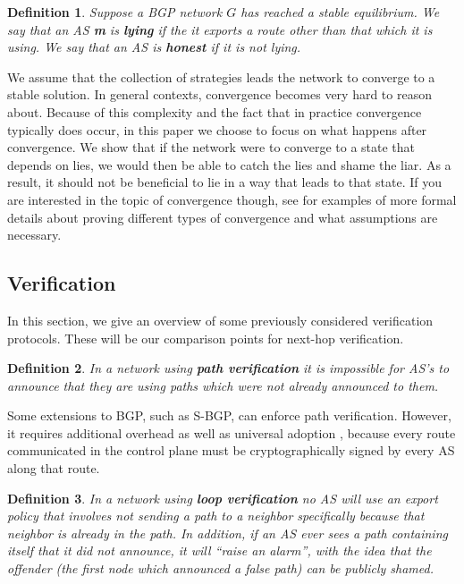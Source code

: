 \documentclass[10pt]{article}
\newtheorem{definition}{Definition}
\begin{document}
    \begin{definition}
      Suppose a BGP network $G$ has reached a stable equilibrium.
      We say that an AS \textbf{m} is \textbf{lying} if the
      it exports a route other than that which it is using.
      We say that an AS is \textbf{honest} if it is not lying.
    \end{definition}

    We assume that the collection of strategies leads the network to converge to a
    stable solution.
    In general contexts, convergence becomes very hard to
    reason about. Because of this complexity and the fact that in practice
    convergence typically does occur,
    in this paper we choose to focus on what happens after
    convergence. We show that if the network were to converge to a state that
    depends on lies, we would then be able to catch the lies and shame the liar.
    As a result, it should not be beneficial to lie in a way that leads to that
    state.
    If you are interested in the topic of convergence though, see
    \cite{RoutingGames, GaoRexford, StablePaths, PolicyPathVector}
    for examples of more formal details about proving different types of convergence
    and what assumptions are necessary.


  \subsection{Verification}
    In this section, we give an overview of some previously considered 
    verification protocols. These will be our comparison points for next-hop
    verification.

    \begin{definition} 
      In a network using \textbf{path verification} it is
      impossible for AS's to announce that they are using paths which were not
      already announced to them.
    \end{definition}

    Some extensions to BGP, such as S-BGP, can enforce path verification.
    However, it requires additional overhead as well as universal adoption
    \cite{PartialDeploy}, because every route communicated in the control plane
    must be cryptographically signed by every AS along that route.

    \begin{definition}
      In a network using \textbf{loop verification} no AS will
      use an export policy that involves not sending a path to a neighbor
      specifically because that neighbor is already in the path.
      In addition, if
      an AS ever sees a path containing itself that it did not announce, it will
      ``raise an alarm'', with the idea that the offender (the first
      node which announced a false path) can be publicly shamed.
    \end{definition}
\end{document}
